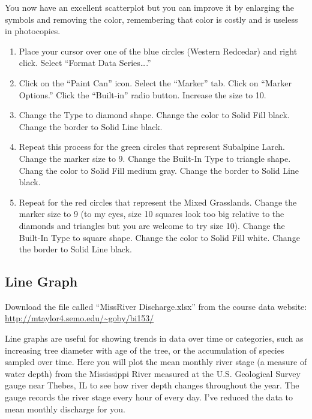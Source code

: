 \documentclass[11pt]{article}
\newcommand{\VSpace}{\vspace{\baselineskip}}
\begin{document}
You now have an excellent scatterplot but you can improve it by enlarging the symbols and removing the color, remembering that color is costly and is useless in photocopies.

\begin{enumerate}[resume]
	\item Place your cursor over one of the blue circles (Western Redcedar) and right click. Select “Format Data Series….” 

	\item Click on the “Paint Can” icon. Select the “Marker” tab. Click on “Marker Options.” Click the “Built-in” radio button.  Increase the size to 10.
	
	\item Change the Type to diamond shape. Change the color to Solid Fill black. Change the border to Solid Line black.

	\item Repeat this process for the green circles that represent Subalpine Larch. Change the marker size to 9. Change the Built-In Type to triangle shape. Chang the color to Solid Fill medium gray.  Change the border to Solid Line black.

	\item Repeat for the red circles that represent the Mixed Grasslands. Change the marker size to 9 (to my eyes, size 10 squares look too big relative to the diamonds and triangles but you are welcome to try size 10). Change the Built-In Type to square shape. Change the color to Solid Fill white.  Change the border to Solid Line black.
\end{enumerate}

\subsection*{Line Graph}

Download the file called “MissRiver Discharge.xlsx” from the course data website: \url{http://mtaylor4.semo.edu/~goby/bi153/}\VSpace

Line graphs are useful for showing trends in data over time or categories, such as increasing tree diameter with age of the tree, or the accumulation of species sampled over time. Here you will plot the mean monthly river stage (a measure of water depth) from the Mississippi River measured at the U.S. Geological Survey gauge near Thebes, IL to see how river depth changes throughout the year. The gauge records the river stage every hour of every day. I’ve reduced the data to mean monthly discharge for you.
\end{document}
